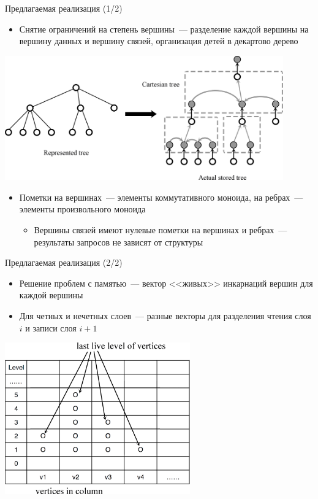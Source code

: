 \documentclass[hyperref=unicode,graphics=pdflatex,13pt]{beamer}
\begin{document}
\begin{frame}[shrink]{Предлагаемая реализация (1/2)}
\begin{itemize}
    \item Снятие ограничений на степень вершины~--- разделение каждой вершины на вершину данных и вершину связей,
          организация детей в декартово дерево
\end{itemize}
\begin{center}
\includegraphics[width=0.9\textwidth]{picture/represented_tree_and_actual_stored_tree.png}
\end{center}
\begin{itemize}
    \item Пометки на вершинах~--- элементы коммутативного моноида, на ребрах~--- элементы 
          произвольного моноида
    \begin{itemize}
        \item Вершины связей имеют нулевые пометки на вершинах и ребрах~--- результаты запросов
              не зависят от структуры
    \end{itemize}
\end{itemize}
\end{frame}

\begin{frame}[shrink]{Предлагаемая реализация (2/2)}
\begin{itemize}
    \item Решение проблем с памятью~--- вектор <<живых>> инкарнаций вершин для каждой вершины
    \item Для четных и нечетных слоев~--- разные векторы для разделения чтения слоя $i$ и записи слоя $i+1$
\end{itemize}
\begin{center}\includegraphics[width=0.6\textwidth]{picture/vertices_in_column.png}\end{center}
\end{frame}
\end{document}

